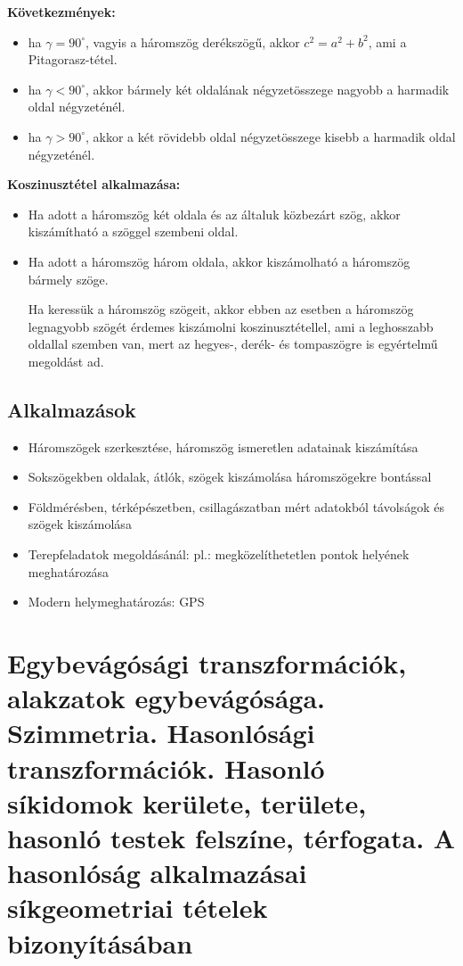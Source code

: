 \documentclass[12pt,a4paper]{article}
\begin{document}
\textbf{Következmények:}
\begin{itemize}
\item ha $\gamma = 90^\circ$, vagyis a háromszög derékszögű, akkor $c^2 = a^2 + b^2$, ami a Pitagorasz-tétel.
\item  ha $\gamma < 90^\circ$, akkor bármely két oldalának négyzetösszege nagyobb a harmadik oldal négyzeténél.
\item ha $\gamma > 90^\circ$, akkor a két rövidebb oldal négyzetösszege kisebb a harmadik oldal négyzeténél.
\end{itemize}
\newpage
\textbf{Koszinusztétel alkalmazása:}
\begin{itemize}
\item Ha adott a háromszög két oldala és az általuk közbezárt szög, akkor kiszámítható a szöggel szembeni oldal.
\item  Ha adott a háromszög három oldala, akkor kiszámolható a háromszög bármely szöge. 

Ha keressük a háromszög szögeit, akkor ebben az esetben a háromszög legnagyobb szögét érdemes kiszámolni koszinusztétellel, ami a leghosszabb oldallal szemben van, mert az hegyes-, derék- és tompaszögre is egyértelmű megoldást ad.
\end{itemize}

\subsection{Alkalmazások}
\begin{itemize}
\item Háromszögek szerkesztése, háromszög ismeretlen adatainak kiszámítása
\item Sokszögekben oldalak, átlók, szögek kiszámolása háromszögekre bontással
\item Földmérésben, térképészetben, csillagászatban mért adatokból távolságok és szögek kiszámolása
\item  Terepfeladatok megoldásánál: pl.: megközelíthetetlen pontok helyének meghatározása
\item  Modern helymeghatározás: GPS
\end{itemize}
\newpage





\section{Egybevágósági transzformációk, alakzatok egybevágósága. Szimmetria. Hasonlósági transzformációk. Hasonló síkidomok kerülete, területe, hasonló testek felszíne, térfogata. A hasonlóság alkalmazásai síkgeometriai tételek bizonyításában}
\end{document}
